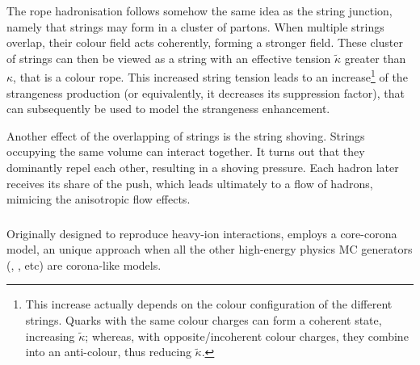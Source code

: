 The rope hadronisation follows somehow the same idea as the string junction, namely that strings may form in a cluster of partons. When multiple strings overlap, their colour field acts coherently, forming a stronger field. These cluster of strings can then be viewed as a string with an effective tension $\tilde{\kappa}$ greater than $\kappa$, that is a colour rope. This increased string tension leads to an increase\footnote{This increase actually depends on the colour configuration of the different strings. Quarks with the same colour charges can form a coherent state, increasing $\tilde{\kappa}$; whereas, with opposite/incoherent colour charges, they combine into an anti-colour, thus reducing $\tilde{\kappa}$.} of the strangeness production (or equivalently, it decreases its suppression factor), that can subsequently be used to model the strangeness enhancement.

Another effect of the overlapping of strings is the string shoving. Strings occupying the same volume can interact together. It turns out that they dominantly repel each other, resulting in a shoving pressure. Each hadron later receives its share of the push, which leads ultimately to a flow of hadrons, mimicing the anisotropic flow effects.

\subsubsection{\Epos}

Originally designed to reproduce heavy-ion interactions, \Epos employs a core-corona model, an unique approach when all the other high-energy physics MC generators (\Pythia, \Herwig, etc) are corona-like models. 

